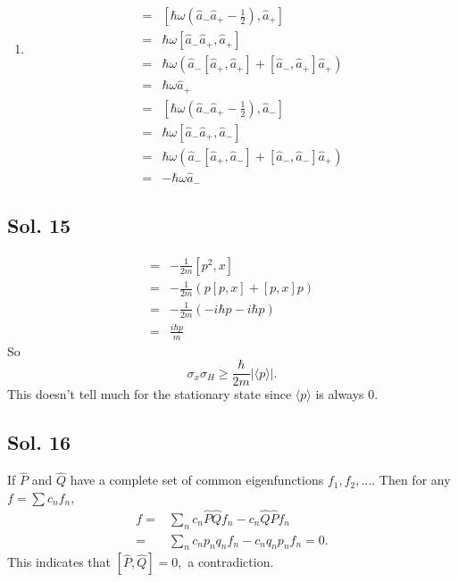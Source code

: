 \begin{enumerate}
    \item 
    \begin{align*}
        [\hat{H}, \hat{a}_{+}] = & 
        \left[ \hbar\omega(\hat{a}_-\hat{a}_+-\frac{1}{2}), \hat{a}_{+}\right]\\
        =&\hbar\omega[\hat{a}_-\hat{a}_+, \hat{a}_+]\\
        =&\hbar\omega (\hat{a}_-[\hat{a}_+, \hat{a}_+]+[\hat{a}_-, \hat{a}_+]\hat{a}_+)\\
        =&\hbar\omega\hat{a}_+
    \end{align*}
    \begin{align*}
        [\hat{H}, \hat{a}_{-}] = & 
        \left[ \hbar\omega(\hat{a}_-\hat{a}_+-\frac{1}{2}), \hat{a}_{-}\right]\\
        =&\hbar\omega[\hat{a}_-\hat{a}_+, \hat{a}_-]\\
        =&\hbar\omega (\hat{a}_-[\hat{a}_+, \hat{a}_-]+[\hat{a}_-, \hat{a}_-]\hat{a}_+)\\
        =&-\hbar\omega\hat{a}_-
    \end{align*}
\end{enumerate}

\subsection*{Sol. 15}
\begin{align*}
    [x,\frac{p^2}{2m}+V]
    =&-\frac{1}{2m}[p^2,x]\\
    =&-\frac{1}{2m}(p[p,x]+[p,x]p)\\
    =&-\frac{1}{2m}(-i\hbar p-i\hbar p)\\
    =&\frac{i\hbar p}{m}
\end{align*}
So 
$$
\sigma_x\sigma_H\geq 
\frac{\hbar}{2m}|\langle p\rangle|.
$$
This doesn't tell much for the stationary state since $\langle p\rangle$ is always 0.

\subsection*{Sol. 16}
If $\hat{P}$ and $\hat{Q}$ have a complete set of
common eigenfunctions $f_1, f_2,\dots$. Then for any $f=\sum c_nf_n,$
\begin{align*}
    [\hat{P}, \hat Q] f
=&\sum_n c_n\hat P \hat Q f_n - 
c_n \hat Q \hat P f_n\\
=&\sum_n c_np_nq_n f_n-c_n q_np_n f_n = 0.
\end{align*}
This indicates that $[\hat{P}, \hat Q]=0,$ a contradiction.

